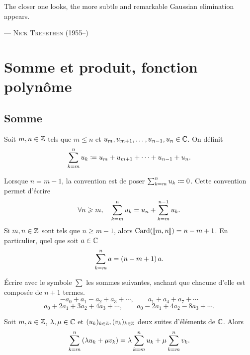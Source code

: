 \documentclass{magnoliaold}
\begin{document}
\setlength{}
\epigraph{\og The closer one looks, the more subtle and remarkable Gaussian elimination appears.\fg}{--- \textsc{Nick Trefethen (1955--)}}
\magtoc



\bigskip

\section{Somme et produit, fonction polynôme}

\subsection{Somme}

\begin{definition}[utile=-3]
Soit $m,n\in\mathbb{Z}$ tels que $m \leq n$ et $u_{m},u_{m+1},\ldots,u_{n-1},u_n\in\mathbb{C}$. On
définit
\[\sum_{k=m}^n u_k\coloneqq u_{m}+u_{m+1}+\cdots+u_{n-1}+u_n.\]
\end{definition}

\begin{remarqueUnique}
\remarque Lorsque $n=m-1$, la convention est de poser $\sum_{k=m}^n u_k\coloneqq 0$. Cette
  convention permet d'écrire
  \[\forall n\geqslant m,\quad \sum_{k=m}^n u_k = u_n + \sum_{k=m}^{n-1} u_k.\]
\remarque Si $m,n\in\mathbb{Z}$ sont tels que $n\geq m-1$, alors $\operatorname{Card}(\left\llbracket m,n\right\rrbracket)=n-m+1$. En
  particulier, quel que soit $a\in\mathbb{C}$
  \[\sum_{k=m}^{n} a =\left(n-m+1\right)a.\]
\end{remarqueUnique}


\begin{exoUnique}
\exo Écrire avec le symbole $\sum$ les sommes suivantes, sachant que chacune d'elle est composée de $n+1$ termes.
  \[-a_0+a_1-a_2 +a_3+\cdots, \qquad a_1+a_4+a_7+\cdots\]
  \[a_0+2a_1+3a_2+4a_3+\cdots, \qquad a_0-2a_1+4a_2-8a_3+\cdots.\]
\end{exoUnique}

\begin{proposition}
Soit $m,n\in\mathbb{Z}$, $\lambda,\mu\in\mathbb{C}$ et $(u_k)_{k\in\mathbb{Z}}, (v_k)_{k\in\mathbb{Z}}$ deux suites d'éléments de $\mathbb{C}$. Alors
\[\sum_{k=m}^n \left(\lambda u_k+\mu v_k\right)=\lambda\sum_{k=m}^n u_k + \mu\sum_{k=m}^n v_k.\]
\end{proposition}
\end{document}
